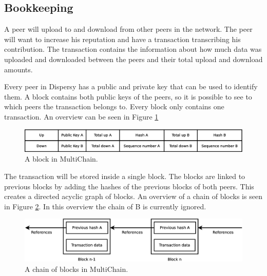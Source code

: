 \subsection{Bookkeeping}
A peer will upload to and download from other peers in the network.
The peer will want to increase his reputation and have a transaction transcribing his contribution.
The transaction contains the information about how much data was uploaded and downloaded between the peers
and their total upload and download amounts.

Every peer in Dispersy has a public and private key that can be used to identify them.
A block contains both public keys of the peers,
so it is possible to see to which peers the transaction belongs to.
Every block only contains one transaction.
An overview can be seen in Figure \ref{fig:block}

\begin{figure}
	\centerline{\includegraphics[scale=0.3]{design/figs/block.eps}}
	\caption{A block in MultiChain.}
	\label{fig:block}
\end{figure}

The transaction will be stored inside a single block.
The blocks are linked to previous blocks by adding the hashes of the previous blocks of both peers.
This creates a directed acyclic graph of blocks.
An overview of a chain of blocks is seen in Figure \ref{fig:transaction-chain}.
In this overview the chain of B is currently ignored.

\begin{figure}
	\centerline{\includegraphics[scale=0.3]{design/figs/transaction-chain.eps}}
	\caption{A chain of blocks in MultiChain.}
	\label{fig:transaction-chain}
\end{figure}
